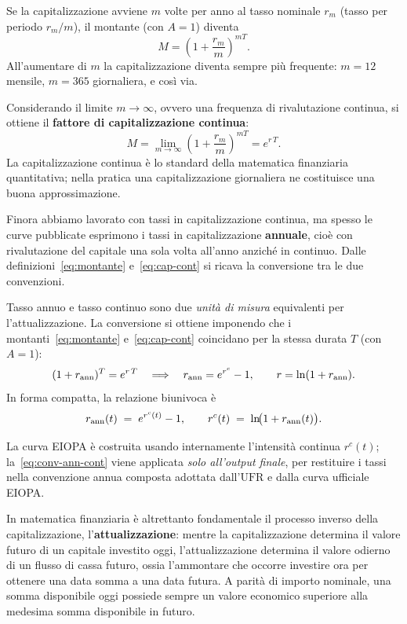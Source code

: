 \documentclass[11pt,a4paper]{article}
\theoremstyle{plain}
\theoremstyle{definition}
\theoremstyle{remark}
\newcommand{\UFR}{\mathrm{UFR}}
\begin{document}
Se la capitalizzazione avviene $m$ volte per anno al tasso nominale $r_m$ (tasso per
periodo $r_m/m$), il montante (con $A=1$) diventa
\[
  M = \left(1 + \frac{r_m}{m}\right)^{mT}.
\]
All'aumentare di $m$ la capitalizzazione diventa sempre pi\`u frequente: $m=12$ mensile,
$m=365$ giornaliera, e cos\`i via.

Considerando il limite ${m\to\infty}$, ovvero una frequenza di rivalutazione continua, si
ottiene il \textbf{fattore di capitalizzazione continua}:
\begin{equation}
  M = \lim_{m\to\infty}\left(1+\frac{r_m}{m}\right)^{mT} = e^{r\,T}.
  \label{eq:cap-cont}
\end{equation}
La capitalizzazione continua \`e lo standard della matematica finanziaria quantitativa; nella
pratica una capitalizzazione giornaliera ne costituisce una buona approssimazione.

Finora abbiamo lavorato con tassi in capitalizzazione continua, ma spesso le curve pubblicate
esprimono i tassi in capitalizzazione \textbf{annuale}, cio\`e con rivalutazione del capitale una
sola volta all'anno anzich\'e in continuo. Dalle definizioni~\eqref{eq:montante}
e~\eqref{eq:cap-cont} si ricava la conversione tra le due convenzioni.

Tasso annuo e tasso continuo sono due \emph{unit\`a di misura} equivalenti per
l'attualizzazione. La conversione si ottiene imponendo che i montanti~\eqref{eq:montante}
e~\eqref{eq:cap-cont} coincidano per la stessa durata $T$ (con $A=1$):
\[
  (1+r_{\rm ann})^T = e^{r\,T}
  \quad\Longrightarrow\quad
  r_{\rm ann} = e^{r^c} - 1,\qquad r = \ln(1+r_{\rm ann}).
\]
In forma compatta, la relazione biunivoca \`e
\begin{equation}
  r_{\rm ann}(t) \;=\; e^{r^c(t)} - 1,
  \qquad
  r^c(t) \;=\; \ln\!\bigl(1 + r_{\rm ann}(t)\bigr).
  \label{eq:conv-ann-cont}
\end{equation}

La curva EIOPA \`e costruita usando internamente l'intensit\`a continua $r^c(t)$;
la~\eqref{eq:conv-ann-cont} viene applicata \emph{solo all'output finale}, per
restituire i tassi nella convenzione annua composta adottata dall'$\UFR$ e dalla curva
ufficiale EIOPA.

In matematica finanziaria \`e altrettanto fondamentale il processo inverso della
capitalizzazione, l'\textbf{attualizzazione}: mentre la capitalizzazione determina il valore
futuro di un capitale investito oggi, l'attualizzazione determina il valore odierno di un
flusso di cassa futuro, ossia l'ammontare che occorre investire ora per ottenere una data somma
a una data futura. A parit\`a di importo nominale, una somma disponibile oggi possiede sempre un
valore economico superiore alla medesima somma disponibile in futuro.
\end{document}
